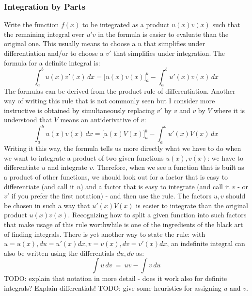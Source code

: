 \subsubsection{Integration by Parts} 
Write the function $f(x)$ to be integrated as a product $u(x)v(x)$ such that the remaining integral over $u' v$ in the formula is easier to evaluate than the original one. This usually means to choose a $u$ that simplifies under differentiation and/or to choose a $v'$ that simplifies under integration. The formula for a definite integral is:
\begin{equation}
  \int_a^b u(x) v'(x) \, dx = \Big[u(x) v(x)\Big]_a^b - \int_a^b u'(x) v(x) \, dx
\end{equation}
The formulas can be derived from the product rule of differentiation. Another way of writing this rule that is not commonly seen but I consider more instructive is obtained by simultaneously replacing $v'$ by $v$ and $v$ by $V$ where it is understood that $V$ means an antiderivative of $v$:
\begin{equation}
  \int_a^b u(x) v(x) \, dx = \Big[u(x) V(x)\Big]_a^b - \int_a^b u'(x) V(x) \, dx
\end{equation}
Writing it this way, the formula tells us more directly what we have to do when we want to integrate a product of two given functions $u(x), v(x)$: we have to differentiate $u$ and integrate $v$. Therefore, when we see a function that is built as a product of other functions, we should look out for a factor that is easy to differentiate (and call it $u$) and a factor that is easy to integrate (and call it $v$ - or $v'$ if you prefer the first notation) - and then use the rule. The factors $u,v$ should be chosen in such a way that $u'(x) V(x)$ is easier to integrate than the original product $u(x) v(x)$. Recognizing how to split a given function into such factors that make usage of this rule worthwhile is one of the ingredients of the black art of finding integrals. There is yet another way to state the rule: with $u = u(x), du = u'(x) dx, v = v(x), dv = v'(x) dx$, an indefinite integral can also be written using the differentials $du, dv$ as:
\begin{equation}
  \int u \, dv \ =\ uv - \int v \, du
\end{equation}
TODO: explain that notation in more detail - does it work also for definite integrals? Explain differentials! TODO: give some heuristics for assigning $u$ and $v$. 


